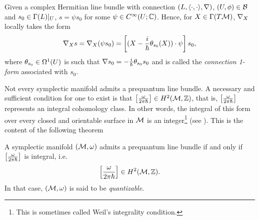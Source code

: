 \documentclass[notas.tex]{subfiles}
\begin{document}
\begin{rem}	
	Given a complex Hermitian line bundle with connection $(L, \langle \cdot,\cdot \rangle, \nabla)$, $(U, \phi) \in \mathcal{B}$ and $s_0 \in \Gamma(L)|_U$, $s = \psi s_0$ for some $\psi \in C^\infty(U; \mathbb{C})$. Hence, for $X \in \Gamma(T\mathcal{M})$, $\nabla_{X}$ locally takes the form
	\begin{equation*}
		\nabla_{X} s = \nabla_{X} (\psi s_0) = \left [(X - \frac{i}{\hbar} \theta_{s_0}(X)) \cdot \psi \right ] s_0,
	\end{equation*}
	where $\theta_{s_0} \in \Omega^1(U)$ is such that $\nabla s_0 = -\frac{i}{\hbar}  \theta_{s_0} s_0$ and is called the \emph{connection 1-form} associated with $s_0$.
\end{rem}


Not every symplectic manifold admits a prequantum line bundle. A necessary and sufficient condition for one to exist is that $\left[ \frac{\omega}{2 \pi \hbar}  \right] \in H^2(\mathcal{M}, \mathbb{Z})$, that is, $\left[ \frac{\omega}{2 \pi \hbar} \right]$ represents an integral cohomology class. In other words, the integral of this form over every closed and orientable surface in $\mathcal{M}$ is an integer\footnote{This is sometimes called Weil's integrality condition.} (see \cite[Ch. 8.3]{woodhouse_geometric_1992}). This is the content of the following theorem
\begin{thm} \label{thm_quantizable_mfld}
	A symplectic manifold $(\mathcal{M}, \omega)$ admits a prequantum line bundle if and only if $\left[ \frac{\omega}{2\pi \hbar} \right]$ is integral, i.e.
	\begin{align*}
		\left[  \frac{\omega}{2\pi\hbar} \right] \in H^2(\mathcal{M}, \mathbb{Z}).
	\end{align*}
	In that case, $(\mathcal{M},\omega)$ is said to be \emph{quantizable}.
\end{thm}
\end{document}
